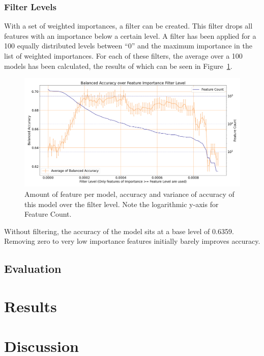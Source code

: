 \subsubsection{Filter Levels}

With a set of weighted importances, a filter can be created. This filter drops
all features with an importance below a certain level. A filter has been applied
for a 100 equally distributed levels between \enquote{0} and the maximum 
importance in the list of weighted importances. For each of these filters, the
average over a 100 models has been calculated, the results of which can be seen
in Figure~\ref{fig:importance_filter}.

\begin{figure}[H]
    \centering
    \includegraphics[width=\textwidth]{img/filter_levels_accuracy_logcount.png}
    \caption{Amount of feature per model, accuracy and variance of accuracy of 
    this model over the filter level. Note the logarithmic y-axis for Feature Count.}\label{fig:importance_filter}
\end{figure}

Without filtering, the accuracy of the model sits at a base level of 
0.6359. Removing zero to very low importance features initially barely improves
accuracy. 

\subsection{Evaluation}

\section{Results}

\section{Discussion}

